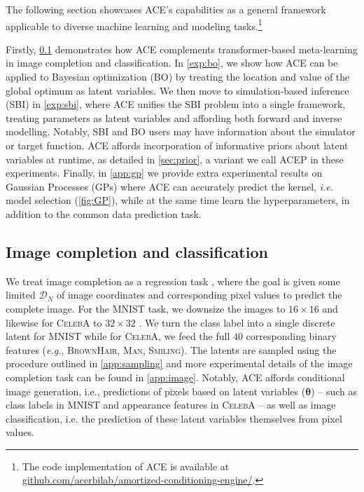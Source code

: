 \documentclass[twoside]{article}
\makeatletter
\newcommand{\vtheta}{{\bm{\theta}}}
\newcommand{\data}{\mathcal{D}}
\newcommand{\ie}{\textit{i.e.}\@\xspace}
\newcommand{\eg}{\textit{e.g.}\@\xspace}
\makeatother
\begin{document}
\vspace{-0.25em}
The following section showcases ACE's capabilities as a general framework applicable to diverse machine learning and modeling tasks.\footnote{The code implementation of ACE is available at \href{https://github.com/acerbilab/amortized-conditioning-engine/}{github.com/acerbilab/amortized-conditioning-engine/}.}

Firstly, \cref{exp:image} demonstrates how ACE complements transformer-based meta-learning in image completion and classification. In \cref{exp:bo}, we show how ACE can be applied to Bayesian optimization (BO) by treating the location and value of the global optimum as latent variables. We then move to simulation-based inference (SBI) in \cref{exp:sbi}, where ACE unifies the SBI problem into a single framework, treating parameters as latent variables and affording both forward and inverse modelling. Notably, SBI and BO users may have information about the simulator or target function. ACE affords incorporation of informative priors about latent variables at runtime, as detailed in \cref{sec:prior}, a variant we call ACEP in these experiments. Finally, 
in \cref{app:gp} we provide extra experimental results on Gaussian Processes (GPs) where ACE can accurately predict the kernel, \ie model selection (\cref{fig:GP}), while at the same time learn the hyperparameters, in addition to the common data prediction task.

\vspace{-0.25em}
\subsection{Image completion and classification}
\label{exp:image}

\vspace{-0.25em}
We treat image completion as a regression task \citep{garnelo2018neural}, where the goal is given some limited $\data_N$ of image coordinates and corresponding pixel values to predict the complete image. For the \textsc{MNIST} \citep{deng2012mnist} task, we downsize the images to $16 \times 16$ and likewise for \textsc{CelebA} to $32 \times 32$ \citep{liu2015faceattributes}. We turn the class label into a single discrete latent for \textsc{MNIST} while for \textsc{CelebA}, we feed the full $40$ corresponding binary features (\eg, \textsc{BrownHair, Man, Smiling}). The latents are sampled using the procedure outlined in \cref{app:sampling} and more experimental details of the image completion task can be found in \cref{app:image}. Notably, ACE affords conditional image generation, i.e., predictions of pixels based on latent variables ($\vtheta$) -- such as class labels in \textsc{MNIST} and appearance features in \textsc{CelebA} -- as well as image classification, i.e. the prediction of these latent variables themselves from pixel values.
\end{document}
